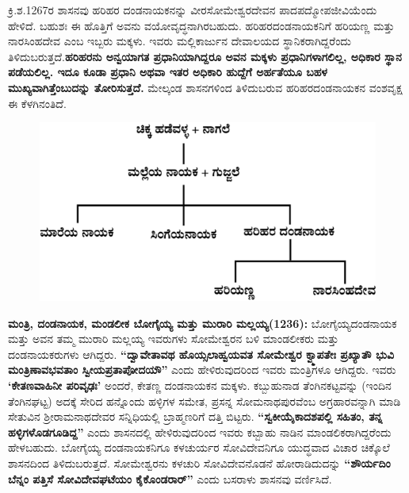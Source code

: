 ಕ್ರಿ.ಶ.1267ರ ಶಾಸನವು ಹರಿಹರ ದಂಡನಾಯಕನನ್ನು ವೀರಸೋಮೇಶ್ವರದೇವನ ಪಾದಪದ್ಮೋಪಜೀವಿಯೆಂದು ಹೇಳಿದೆ. ಬಹುಶಃ ಈ ಹೊತ್ತಿಗೆ ಅವನು ವಯೋವೃದ್ಧನಾಗಿರಬಹುದು. ಹರಿಹರದಂಡನಾಯಕನಿಗೆ ಹರಿಯಣ್ಣ ಮತ್ತು ನಾರಸಿಂಹದೇವ ಎಂಬ ಇಬ್ಬರು ಮಕ್ಕಳು. ಇವರು ಮಲ್ಲಿಕಾರ್ಜುನ ದೇವಾಲಯದ ಸ್ಥಾನಿಕರಾಗಿದ್ದರೆಂದು ತಿಳಿದುಬರುತ್ತದೆ.\break \textbf{ಹರಿಹರನು ಅನ್ವಯಾಗತ ಪ್ರಧಾನಿಯಾಗಿದ್ದರೂ ಅವನ ಮಕ್ಕಳು ಪ್ರಧಾನಿಗಳಾಗಲಿಲ್ಲ, ಅಧಿಕಾರ ಸ್ಥಾನ ಪಡೆಯಲಿಲ್ಲ. ಇದೂ ಕೂಡಾ ಪ್ರಧಾನಿ ಅಥವಾ ಇತರ ಅಧಿಕಾರಿ ಹುದ್ದೆಗೆ ಅರ್ಹತೆಯೂ ಬಹಳ ಮುಖ್ಯವಾಗಿತ್ತೆಂಬುದನ್ನು ತೋರಿಸುತ್ತದೆ. }ಮೇಲ್ಕಂಡ ಶಾಸನಗಳಿಂದ ತಿಳಿದುಬರುವ ಹರಿಹರದಂಡನಾಯಕನ ವಂಶವೃಕ್ಷ ಈ ಕೆಳಗಿನಂತಿದೆ.
\begin{figure}[H]
\includegraphics[scale=1.15]{images/chap3/chap3fig19.jpeg}
\end{figure}

\textbf{ಮಂತ್ರಿ, ದಂಡನಾಯಕ, ಮಂಡಲೀಕ ಬೋಗೈಯ್ಯ ಮತ್ತು ಮುರಾರಿ ಮಲ್ಲಯ್ಯ(1236):} ಬೋಗೈಯ್ಯ\break ದಂಡನಾಯಕ ಮತ್ತು ಅವನ ತಮ್ಮ ಮುರಾರಿ ಮಲ್ಲಯ್ಯ ಇವರುಗಳು ಸೋಮೇಶ್ವರನ ಬಳಿ ಮಾಂಡಲೀಕರು ಮತ್ತು ದಂಡನಾಯಕರುಗಳು ಆಗಿದ್ದರು.\textbf{ “ದ್ವಾವೇತಾವಥ ಹೊಯ್ಸಲಾಹ್ವಯವತ ಸೋಮೇಶ್ವರ ಕ್ವ್ಮಾಪತೇಃ ಪ್ರಖ್ಯಾತೌ ಭುವಿ ಮಂತ್ರಿಣಾವಭವತಾಂ ಸ್ವೀಯಪ್ರತಾಪೋದಯೌ”} ಎಂದು ಹೇಳಿರುವುದರಿಂದ ಇವರು ಮಂತ್ರಿಗಳೂ ಆಗಿದ್ದರು. ಇವರು \textbf{‘ಕೇತಣವಾಹಿನೀ ಪರಿವೃಢಃ’} ಅಂದರೆ, ಕೇತಣ್ಣ ದಂಡನಾಯಕನ ಮಕ್ಕಳು. ಕಬ್ಬುಹುನಾಡ ತೆಂಗಿನಕಟ್ಟವನ್ನು (ಇಂದಿನ ತೆಂಗಿನಘಟ್ಟ) ಅದಕ್ಕೆ ಸೇರಿದ ಹನ್ನೊಂದು ಹಳ್ಳಿಗಳ ಸಮೇತ, ಪ್ರಸನ್ನ ಸೋಮನಾಥಪುರವೆಂಬ ಅಗ್ರಹಾರವನ್ನಾಗಿ ಮಾಡಿ ಸೇತುವಿನ ಶ‍್ರೀರಾಮನಾಥದೇವರ ಸನ್ನಿಧಿಯಲ್ಲಿ ಬ್ರಾಹ್ಮಣರಿಗೆ ದತ್ತಿ ಬಿಟ್ಟರು. \textbf{“ಸ್ವಕೀಯೈಕಾದಶಪಲ್ಲಿ ಸಹಿತಂ, ತನ್ನ ಹಳ್ಳಿಗಳೊಡಗೂಡಿದ್ದ”} ಎಂದು ಶಾಸನದಲ್ಲಿ ಹೇಳಿರುವುದರಿಂದ ಇವರು ಕಬ್ಬಾಹು ನಾಡಿನ ಮಾಂಡಲಿಕರಾಗಿದ್ದರೆಂದು ಹೇಳ\-ಬಹುದು. ಬೋಗೈಯ್ಯ ದಂಡನಾಯಕನಿಗೂ ಕಳಚುರ್ಯರ ಸೋವಿದೇವನಿಗೂ ಯುದ್ಧವಾದ ವಿಚಾರ ಚಿಕ್ಕೊಲೆ ಶಾಸನದಿಂದ ತಿಳಿದು\-ಬರುತ್ತದೆ. ಸೋಮೇಶ್ವರನು ಕಳಚುರಿ ಸೋವಿದೇವನೊಡನೆ ಹೋರಾಡಿದುದನ್ನು \textbf{“ಶೌರ್ಯದಿಂ ಬೆನ್ನಂ ಪತ್ತಿಸೆ ಸೋವಿದೇವಘಟೆಯಂ ಕೈಕೊಂಡರಾರ್​”} ಎಂದು ಬಸರಾಳು ಶಾಸನವು ವರ್ಣಿಸಿದೆ.

